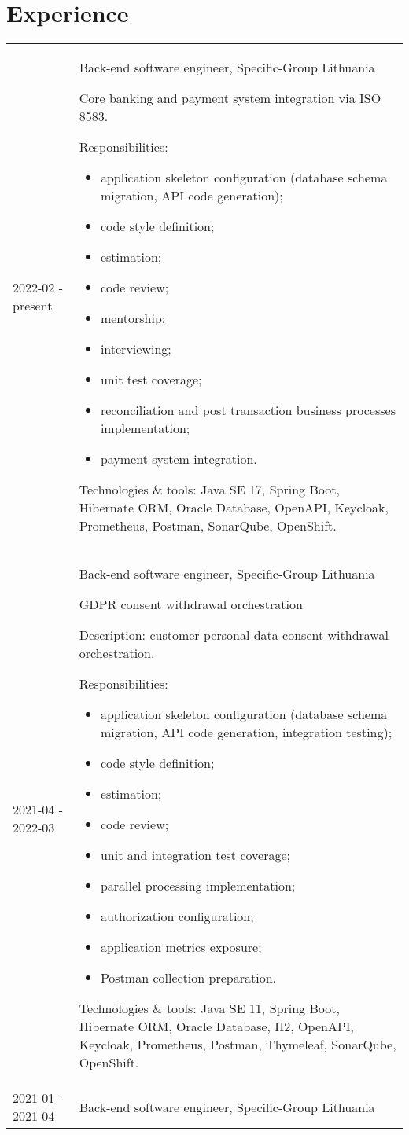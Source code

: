 \documentclass{article}
\begin{document}
    \section*{Experience}
    \begin{longtable}{l p{450pt}}
        2022-02 - present & Back-end software engineer, Specific-Group Lithuania

        Core banking and payment system integration via ISO 8583.

        Responsibilities:
        \begin{itemize}
            \item application skeleton configuration (database schema migration, API code generation);
            \item code style definition;
            \item estimation;
            \item code review;
            \item mentorship;
            \item interviewing;
            \item unit test coverage;
            \item reconciliation and post transaction business processes implementation;
            \item payment system integration.
        \end{itemize}

        Technologies \& tools: Java SE 17, Spring Boot, Hibernate ORM, Oracle Database, OpenAPI, Keycloak, Prometheus, Postman, SonarQube, OpenShift.
        \\[8pt]
        2021-04 - 2022-03 & Back-end software engineer, Specific-Group Lithuania

        GDPR consent withdrawal orchestration

        Description: customer personal data consent withdrawal orchestration.

        Responsibilities:
        \begin{itemize}
            \item application skeleton configuration (database schema migration, API code generation, integration testing);
            \item code style definition;
            \item estimation;
            \item code review;
            \item unit and integration test coverage;
            \item parallel processing implementation;
            \item authorization configuration;
            \item application metrics exposure;
            \item Postman collection preparation.
        \end{itemize}
        Technologies \& tools: Java SE 11, Spring Boot, Hibernate ORM, Oracle Database, H2, OpenAPI, Keycloak, Prometheus, Postman, Thymeleaf, SonarQube, OpenShift.
        \\[8pt]
        2021-01 - 2021-04 & Back-end software engineer, Specific-Group Lithuania


\end{longtable}
\end{document}
